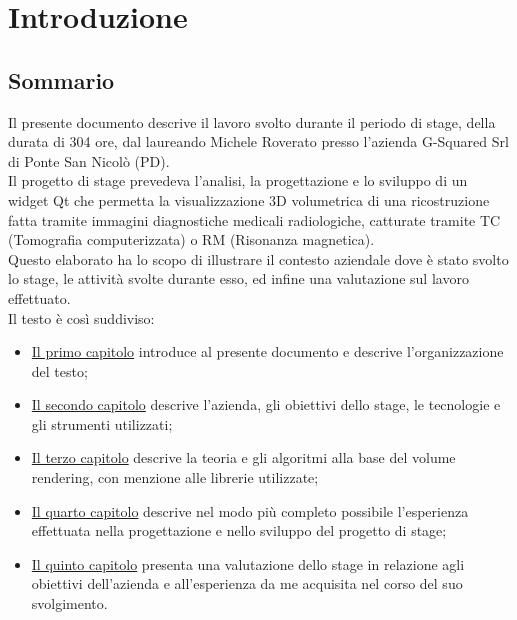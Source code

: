 
\chapter{Introduzione}
\label{cap:introduzione}

\section{Sommario}

Il presente documento descrive il lavoro svolto durante il periodo di stage, della durata di 304 ore, dal laureando Michele Roverato presso l'azienda G-Squared Srl di Ponte San Nicolò (PD).
\\
Il progetto di stage prevedeva l'analisi, la progettazione e lo sviluppo di un widget Qt che permetta la visualizzazione 3D volumetrica di una ricostruzione fatta tramite immagini diagnostiche medicali radiologiche, catturate tramite TC (Tomografia computerizzata) o RM (Risonanza magnetica).
\\
Questo elaborato ha lo scopo di illustrare il contesto aziendale dove è stato svolto lo stage, le attività svolte durante esso, ed infine una valutazione sul lavoro effettuato.
\\
Il testo è così suddiviso:
\begin{itemize}
    \item \hyperref[cap:introduzione]{Il primo capitolo} introduce al presente documento e descrive l'organizzazione del testo;
    \item \hyperref[cap:descrizione-stage]{Il secondo capitolo} descrive l'azienda, gli obiettivi dello stage, le tecnologie e gli strumenti utilizzati;
    \item \hyperref[cap:teoria-stage]{Il terzo capitolo} descrive la teoria e gli algoritmi alla base del volume rendering, con menzione alle librerie utilizzate;
    \item \hyperref[cap:resoconto-stage]{Il quarto capitolo} descrive nel modo più completo possibile l'esperienza effettuata nella progettazione e nello sviluppo del progetto di stage;
	\item \hyperref[cap:conclusioni]{Il quinto capitolo} presenta una valutazione dello stage in relazione agli obiettivi dell'azienda e all'esperienza da me acquisita nel corso del suo svolgimento.
\end{itemize}

